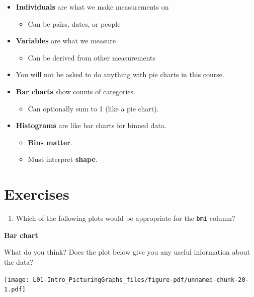 \documentclass[
  letterpaper,
  DIV=11,
  numbers=noendperiod,
  oneside]{scrreprt}
\providecommand{\tightlist}{%
  \setlength{\itemsep}{0pt}\setlength{\parskip}{0pt}}\usepackage{longtable,booktabs,array}
\begin{document}
\begin{itemize}
\tightlist
\item
  \textbf{Individuals} are what we make measurements on

  \begin{itemize}
  \tightlist
  \item
    Can be pairs, dates, or people
  \end{itemize}
\item
  \textbf{Variables} are what we measure

  \begin{itemize}
  \tightlist
  \item
    Can be derived from other measurements
  \end{itemize}
\item
  You will not be asked to do anything with pie charts in this course.
\item
  \textbf{Bar charts} show counts of categories.

  \begin{itemize}
  \tightlist
  \item
    Can optionally sum to 1 (like a pie chart).
  \end{itemize}
\item
  \textbf{Histograms} are like bar charts for binned data.

  \begin{itemize}
  \tightlist
  \item
    \textbf{Bins matter}.
  \item
    Must interpret \textbf{shape}.
  \end{itemize}
\end{itemize}

\hypertarget{exercises}{%
\section{Exercises}\label{exercises}}

\begin{enumerate}
\def\labelenumi{\arabic{enumi}.}
\tightlist
\item
  Which of the following plots would be appropriate for the \texttt{bmi}
  column?
\end{enumerate}

\textbf{Bar chart}

What do you think? Does the plot below give you any useful information
about the data?

\texttt{[image: L01-Intro\_PicturingGraphs\_files/figure-pdf/unnamed-chunk-20-1.pdf]}
\end{document}
